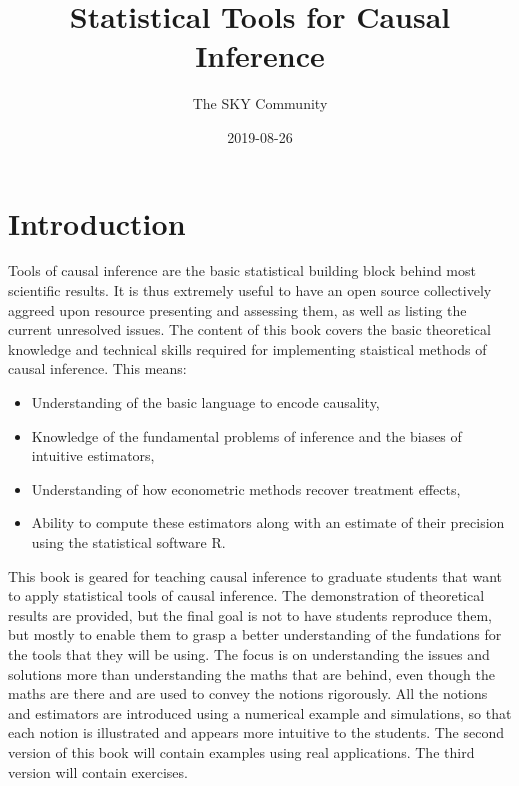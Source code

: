 \documentclass[]{book}
\title{Statistical Tools for Causal Inference}
\author{The SKY Community}
\date{2019-08-26}
\providecommand{\tightlist}{%
  \setlength{\itemsep}{0pt}\setlength{\parskip}{0pt}}
\theoremstyle{definition}
\theoremstyle{definition}
\theoremstyle{definition}
\theoremstyle{remark}
\begin{document}
\maketitle

{
\setcounter{tocdepth}{0}
\tableofcontents
}
\hypertarget{introduction}{%
\chapter*{Introduction}\label{introduction}}

Tools of causal inference are the basic statistical building block behind most scientific results.
It is thus extremely useful to have an open source collectively aggreed upon resource presenting and assessing them, as well as listing the current unresolved issues.
The content of this book covers the basic theoretical knowledge and technical skills required for implementing staistical methods of causal inference.
This means:

\begin{itemize}
\tightlist
\item
  Understanding of the basic language to encode causality,
\item
  Knowledge of the fundamental problems of inference and the biases of intuitive estimators,
\item
  Understanding of how econometric methods recover treatment effects,
\item
  Ability to compute these estimators along with an estimate of their precision using the statistical software R.
\end{itemize}

This book is geared for teaching causal inference to graduate students that want to apply statistical tools of causal inference.
The demonstration of theoretical results are provided, but the final goal is not to have students reproduce them, but mostly to enable them to grasp a better understanding of the fundations for the tools that they will be using.
The focus is on understanding the issues and solutions more than understanding the maths that are behind, even though the maths are there and are used to convey the notions rigorously.
All the notions and estimators are introduced using a numerical example and simulations, so that each notion is illustrated and appears more intuitive to the students.
The second version of this book will contain examples using real applications.
The third version will contain exercises.
\end{document}
